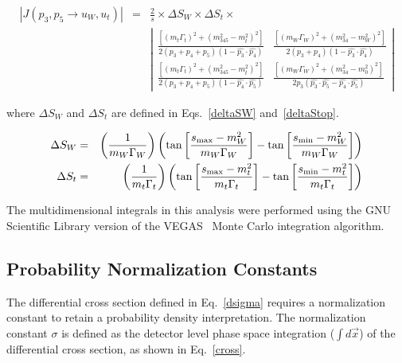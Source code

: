 \begin{itemize}
\begin{eqnarray}
\label{st_jac2}
\nonumber
|J(p_{3}, p_{5} \rightarrow u_{W}, u_{t})| &=& 
\frac{2}{s} \times \Delta S_{W} \times \Delta S_{t} \times \\
& & \left| \begin{array}{cc}
\frac{\left[
(m_{t}\Gamma_{t})^{2} + (m^{2}_{345} - m_{t}^{2})^{2} \right]}{2(p_{3} + p_{4} + p_{5})(1 - \hat{p_{3}} \cdot \hat{p_{4}})}	& \frac{\left[
(m_{W}\Gamma_{W})^{2} + (m^{2}_{34} - m_{W}^{2})^{2} \right]}{2(p_{3} + p_{4})(1 -
\hat{p_{3}} \cdot \hat{p_{4}})} \\
\frac{\left[
(m_{t}\Gamma_{t})^{2} + (m^{2}_{345} - m_{t}^{2})^{2} \right]}{2(p_{3} + p_{4} + p_{5})(1 - \hat{p_{4}} \cdot \hat{p_{5}})}	& \frac{\left[
(m_{W}\Gamma_{W})^{2} + (m^{2}_{34} - m_{0}^{2})^{2} \right]}{2p_{3}(\hat{p_{3}} \cdot \hat{p_{5}} - \hat{p_{4}} \cdot \hat{p_{5}})}
\end{array}
\right|
\end{eqnarray}

where $\Delta S_{W}$ and $\Delta S_{t}$ are defined in Eqs.~\ref{deltaSW} and~\ref{deltaStop}.

\begin{eqnarray}
\label{deltaSW}
\Delta S_{W} &=& \left( \frac{1}{m_{W}\Gamma_{W}} \right) \left(  \tan \left[ \frac{s_{\rm{max}} - m_{W}^{2}}{m_{W}\Gamma_{W}} \right] - \tan \left[ \frac{s_{\rm{min}} - m_{W}^{2}}{m_{W}\Gamma_{W}} \right] \right)	\\
\label{deltaStop}
\Delta S_{t} &=& \left( \frac{1}{m_{t}\Gamma_{t}} \right) \left(  \tan \left[ \frac{s_{\rm{max}} - m_{t}^{2}}{m_{t}\Gamma_{t}} \right] - \tan \left[ \frac{s_{\rm{min}} - m_{t}^{2}}{m_{t}\Gamma_{t}} \right] \right)
\end{eqnarray}

\end{itemize}

The multidimensional integrals in this analysis were performed using the GNU Scientific Library version of the VEGAS~\cite{Lepage:1980dq} Monte Carlo integration algorithm. 


\subsection{Probability Normalization Constants}
\label{normalization}

The differential cross section defined in Eq.~\ref{dsigma}
requires a normalization constant to retain a probability density
interpretation. The normalization constant $\sigma$ is defined as the
detector level phase space integration ($\int d\vec{x}$) of the
differential cross section, as shown in Eq.~\ref{cross}.

